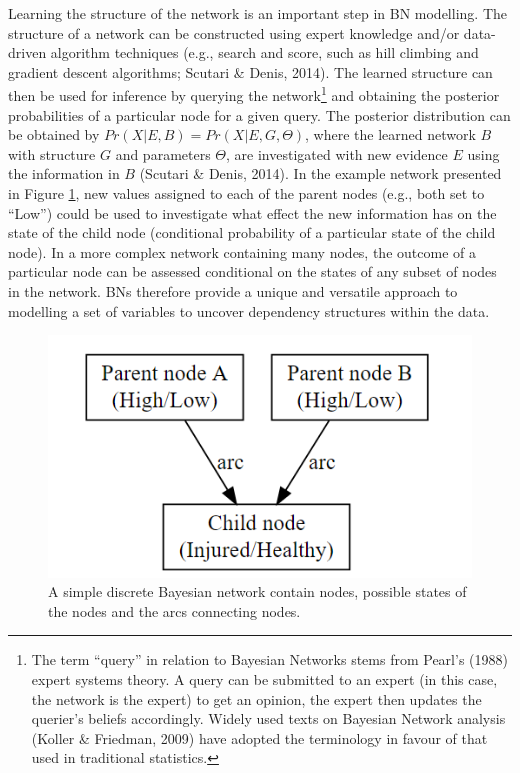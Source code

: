 \documentclass[
  english,
  man,floatsintext]{apa6}
\begin{document}
Learning the structure of the network is an important step in BN modelling. The structure of a network can be constructed using expert knowledge and/or data-driven algorithm techniques (e.g., search and score, such as hill climbing and gradient descent algorithms; Scutari \& Denis, 2014).
The learned structure can then be used for inference by querying the network\footnote{The term \enquote{query} in relation to Bayesian Networks stems from Pearl's (1988) expert systems theory. A query can be submitted to an expert (in this case, the network is the expert) to get an opinion, the expert then updates the querier's beliefs accordingly. Widely used texts on Bayesian Network analysis (Koller \& Friedman, 2009) have adopted the terminology in favour of that used in traditional statistics.} and obtaining the posterior probabilities of a particular node for a given query.
The posterior distribution can be obtained by \(Pr(X|E,B) = Pr(X|E,G,\Theta)\), where the learned network \(B\) with structure \(G\) and parameters \(\Theta\), are investigated with new evidence \(E\) using the information in \(B\) (Scutari \& Denis, 2014).
In the example network presented in Figure \ref{fig:examplenetwork}, new values assigned to each of the parent nodes (e.g., both set to \enquote{Low}) could be used to investigate what effect the new information has on the state of the child node (conditional probability of a particular state of the child node).
In a more complex network containing many nodes, the outcome of a particular node can be assessed conditional on the states of any subset of nodes in the network.
BNs therefore provide a unique and versatile approach to modelling a set of variables to uncover dependency structures within the data.

\begin{figure}[H]

{\centering \includegraphics[width=0.5\linewidth]{figs/study1/examplenetwork} 

}

\caption{A simple discrete Bayesian network contain nodes, possible states of the nodes and the arcs connecting nodes.}\label{fig:examplenetwork}
\end{figure}
\end{document}
